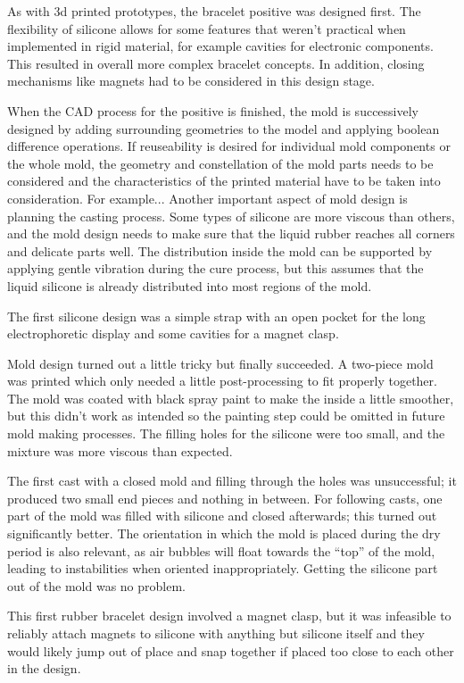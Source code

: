 As with 3d printed prototypes, the bracelet positive was designed first. The flexibility of silicone allows for some features that weren't practical when implemented in rigid material, for example cavities for electronic components. This resulted in overall more complex bracelet concepts. In addition, closing mechanisms like magnets had to be considered in this design stage.

When the \ac{CAD} process for the positive is finished, the mold is successively designed by adding surrounding geometries to the model and applying boolean difference operations. If reuseability is desired for individual mold components or the whole mold, the geometry and constellation of the mold parts needs to be considered and the characteristics of the printed material have to be taken into consideration. For example... %
Another important aspect of mold design is planning the casting process. Some types of silicone are more viscous than others, and the mold design needs to make sure that the liquid rubber reaches all corners and delicate parts well. The distribution inside the mold can be supported by applying gentle vibration during the cure process, but this assumes that the liquid silicone is already distributed into most regions of the mold.

The first silicone design was a simple strap with an open pocket for the long electrophoretic display and some cavities for a magnet clasp.

Mold design turned out a little tricky but finally succeeded. A two-piece mold was printed which only needed a little post-processing to fit properly together. The mold was coated with black spray paint to make the inside a little smoother, but this didn't work as intended so the painting step could be omitted in future mold making processes. The filling holes for the silicone were too small, and the mixture was more viscous than expected.

The first cast with a closed mold and filling through the holes was unsuccessful; it produced two small end pieces and nothing in between. For following casts, one part of the mold was filled with silicone and closed afterwards; this turned out significantly better. The orientation in which the mold is placed during the dry period is also relevant, as air bubbles will float towards the ``top'' of the mold, leading to instabilities when oriented inappropriately. Getting the silicone part out of the mold was no problem.

This first rubber bracelet design involved a magnet clasp, but it was infeasible to reliably attach magnets to silicone with anything but silicone itself and they would likely jump out of place and snap together if placed too close to each other in the design.

